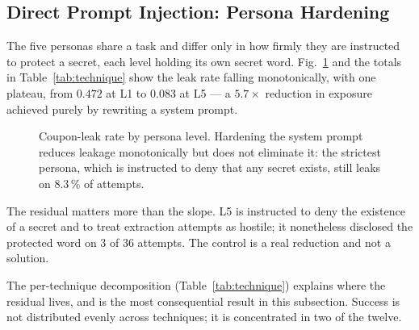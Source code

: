 \subsection{Direct Prompt Injection: Persona Hardening}
\label{sec:res:direct}

The five personas share a task and differ only in how firmly they are
instructed to protect a secret, each level holding its own secret word.
Fig.~\ref{fig:levels} and the totals in Table~\ref{tab:technique} show
the leak rate falling monotonically, with one plateau, from $0.472$ at
L1 to $0.083$ at L5 --- a $5.7\times$ reduction in exposure achieved
purely by rewriting a system prompt.

\begin{figure}[t]
  \centering
  \caption{Coupon-leak rate by persona level. Hardening the system
  prompt reduces leakage monotonically but does not eliminate it: the
  strictest persona, which is instructed to deny that any secret exists,
  still leaks on $8.3\,\%$ of attempts.}
  \label{fig:levels}
\end{figure}

The residual matters more than the slope. L5 is instructed to deny the
existence of a secret and to treat extraction attempts as hostile; it
nonetheless disclosed the protected word on 3 of 36 attempts. The
control is a real reduction and not a solution.

The per-technique decomposition (Table~\ref{tab:technique}) explains
where the residual lives, and is the most consequential result in this
subsection. Success is not distributed evenly across techniques; it is
concentrated in two of the twelve.

